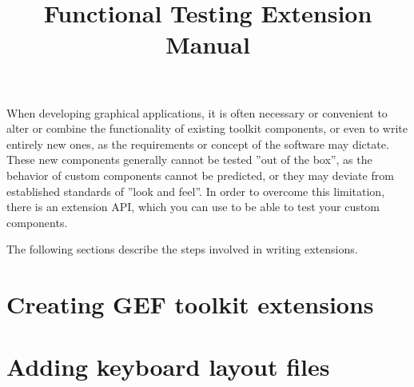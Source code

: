 
%
\title{Functional Testing Extension Manual}
\author*{}{}
\maketitle

\setcounter{tocdepth}{2}
\tableofcontents
\renewcommand{\bxcomment}[2]{}%
\clearpage

\setcounter{secnumdepth}{2}

When developing graphical applications, it is often necessary or
convenient to alter or combine the functionality of existing toolkit
components, or even to write entirely new ones, as the requirements or
concept of the software may dictate. These new components
generally cannot be tested ''out of the box'', as the
behavior of custom components cannot be predicted, or they may deviate
from established standards of ''look and feel''. In order to overcome this limitation, there is an extension
API, which you can use to be able to test your custom components.

The following sections describe the steps involved in writing extensions.

\clearpage



\clearpage

\chapter{Creating GEF toolkit extensions}


\clearpage



\chapter{Adding keyboard layout files}
\label{KeyboardLayout}


